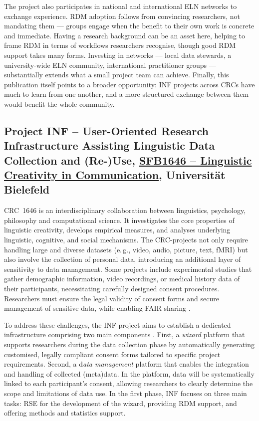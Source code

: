 \documentclass{eceasst}
\newcommand{\eg}{e.\,g.}
\begin{document}
The project also participates in national and international ELN networks to exchange experience.
RDM adoption follows from convincing researchers, not mandating them --- groups engage when the benefit to their own work is concrete and immediate.
Having a research background can be an asset here, helping to frame RDM in terms of workflows researchers recognise, though good RDM support takes many forms.
Investing in networks --- local data stewards, a university-wide ELN community, international practitioner groups --- substantially extends what a small project team can achieve.
Finally, this publication itself points to a broader opportunity: INF projects across CRCs have much to learn from one another, and a more structured exchange between them would benefit the whole community.

\subsection{Project INF – User-Oriented Research Infrastructure Assisting Linguistic Data Collection and (Re-)Use, \href{https://purl.org/crc1646}{SFB1646 – Linguistic Creativity in Communication}, Universität Bielefeld}

CRC~1646 is an interdisciplinary collaboration between linguistics, psychology, philosophy and computational science. It investigates the core properties of linguistic creativity, develops empirical measures, and analyses underlying linguistic, cognitive, and social mechanisms. %
The CRC-projects not only require handling large and diverse datasets (\eg, video, audio, picture, text, fMRI) but also involve the collection of personal data, introducing an additional layer of sensitivity to data management. Some projects include experimental studies that gather demographic information, video recordings, or medical history data of their participants, necessitating carefully designed consent procedures. Researchers must ensure the legal \cite{GDPR2016} validity of consent forms and secure management of sensitive data, while enabling FAIR sharing \cite{WilkinsonDumontier2016}.

To address these challenges, the INF project aims to establish a dedicated infrastructure comprising two main components \cite{JorschickSchrader2024}.
First, a \textit{wizard} platform that supports researchers during the data collection phase by automatically generating customised, legally compliant consent forms tailored to specific project requirements.
Second, a d\emph{ata management} platform that enables the integration and handling of collected (meta)data. In the platform, data will be systematically linked to each participant's consent, allowing researchers to clearly determine the scope and limitations of data use. In the first phase, INF focuses on three main tasks: RSE for the development of the wizard, providing RDM support, and offering methods and statistics support.
\end{document}
